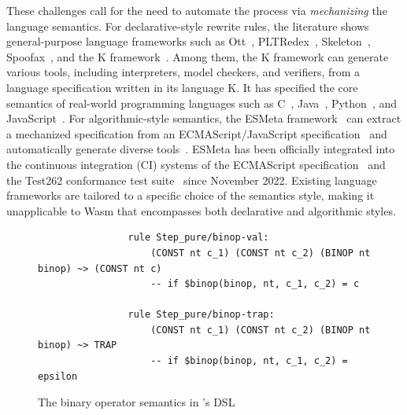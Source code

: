 These challenges call for the need to automate the process via \textit{mechanizing} the language semantics.
For declarative-style rewrite rules, the literature shows general-purpose language frameworks such as
Ott~\cite{ott}, PLTRedex~\cite{pltredex}, Skeleton~\cite{skeleton}, Spoofax~\cite{spoofax},
and the K framework~\cite{k}. Among them, the K framework can generate various tools,
including interpreters, model checkers, and verifiers, from a language specification written in its language K.
It has specified the core semantics of real-world programming languages
such as C~\cite{kc}, Java~\cite{kjava}, Python~\cite{kpython}, and JavaScript~\cite{kjs}.
For algorithmic-style semantics, the ESMeta framework~\cite{esmeta}
can extract a mechanized specification from
an ECMAScript/JavaScript specification~\cite{ecmascript} and automatically
generate diverse tools~\cite{jiset,jest,jstar,jsaver}.
%
%
%
ESMeta has been officially integrated into the continuous integration (CI) systems of
the ECMAScript specification~\cite{ciecma262} and the Test262 conformance test suite~\cite{citest262}
since November 2022.
Existing language frameworks are tailored to a specific choice of the semantics style, 
making it unapplicable to Wasm that encompasses both declarative and algorithmic styles.

\begin{figure}[t]
\footnotesize
\begin{verbatim}
                rule Step_pure/binop-val:
                    (CONST nt c_1) (CONST nt c_2) (BINOP nt binop) ~> (CONST nt c)
                    -- if $binop(binop, nt, c_1, c_2) = c

                rule Step_pure/binop-trap:
                    (CONST nt c_1) (CONST nt c_2) (BINOP nt binop) ~> TRAP
                    -- if $binop(binop, nt, c_1, c_2) = epsilon
\end{verbatim}
\caption{The binary operator semantics in \spectec's DSL}
\label{fig:dsl}
\end{figure}

